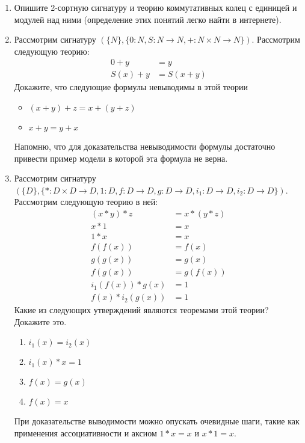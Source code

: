 \begin{enumerate}

\item Опишите 2-сортную сигнатуру и теорию коммутативных колец с единицей и модулей над ними (определение этих понятий легко найти в интернете).

\item Рассмотрим сигнатуру $(\{N\}, \{ 0 : N, S : N \to N, + : N \times N \to N \})$.
    Рассмотрим следующую теорию:
\begin{align*}
0 + y & = y \\
S(x) + y & = S(x + y)
\end{align*}
Докажите, что следующие формулы невыводимы в этой теории
\begin{itemize}
\item $(x + y) + z = x + (y + z)$
\item $x + y = y + x$
\end{itemize}
Напомню, что для доказательства невыводимости формулы достаточно привести пример модели в которой эта формула не верна.

\item Рассмотрим сигнатуру $(\{D\}, \{ * : D \times D \to D, 1 : D, f : D \to D, g : D \to D, i_1 : D \to D, i_2 : D \to D \})$.
    Рассмотрим следующую теорию в ней:
\begin{align*}
(x * y) * z & = x * (y * z) \\
x * 1 & = x \\
1 * x & = x \\
f(f(x)) & = f(x) \\
g(g(x)) & = g(x) \\
f(g(x)) & = g(f(x)) \\
i_1(f(x)) * g(x) & = 1 \\
f(x) * i_2(g(x)) & = 1
\end{align*}
Какие из следующих утверждений являются теоремами этой теории? Докажите это.
\begin{enumerate}
\item $i_1(x) = i_2(x)$
\item $i_1(x) * x = 1$
\item $f(x) = g(x)$
\item $f(x) = x$
\end{enumerate}
При доказательстве выводимости можно опускать очевидные шаги, такие как применения ассоциативности и аксиом $1 * x = x$ и $x * 1 = x$.


\end{enumerate}
